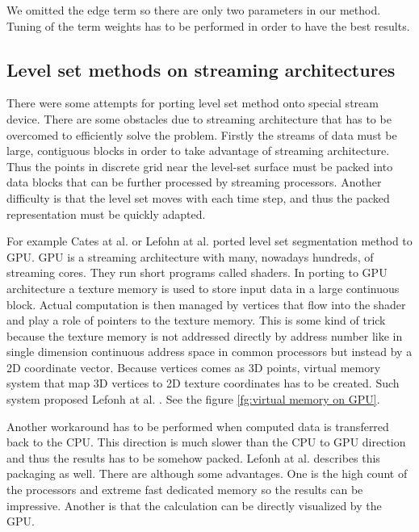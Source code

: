 We omitted the edge term so there are only two parameters in our method.
Tuning of the term weights has to be performed in order to have the best results.

\subsection{Level set methods on streaming architectures}

\par
There were some attempts for porting level set method onto special stream device.
There are some obstacles due to streaming architecture that has to be overcomed to efficiently solve the problem.
Firstly the streams of data must be large, contiguous blocks in order to take advantage of streaming architecture.
Thus the points in discrete grid near the level-set surface must be packed into data blocks that can be further processed by streaming processors.
Another difficulty is that the level set moves with each time step, and thus the packed representation must be quickly adapted.

\par
For example Cates at al. \cite{GIST} or Lefohn at al. \cite{lefonhGPUSolver} ported level set segmentation method to GPU.
GPU is a streaming architecture with many, nowadays hundreds, of streaming cores.
They run short programs called shaders.
In porting to GPU architecture a texture memory is used to store input data in a large continuous block.
Actual computation is then managed by vertices that flow into the shader and play a role of pointers to the texture memory.
This is some kind of trick because the texture memory is not addressed directly by address number like in single dimension continuous address space in common processors but instead by a 2D coordinate vector.
Because vertices comes as 3D points, virtual memory system that map 3D vertices to 2D texture coordinates has to be created.
Such system proposed Lefonh at al. \cite{lefonhGPUSolver}. See the figure \ref{fg:virtual memory on GPU}.

\par
Another workaround has to be performed when computed data is transferred back to the CPU.
This direction is much slower than the CPU to GPU direction and thus the results has to be somehow packed.
Lefonh at al. \cite{lefonhGPUSolver} describes this packaging as well.
There are although some advantages.
One is the high count of the processors and extreme fast dedicated memory so the results can be impressive.
Another is that the calculation can be directly visualized by the GPU.

